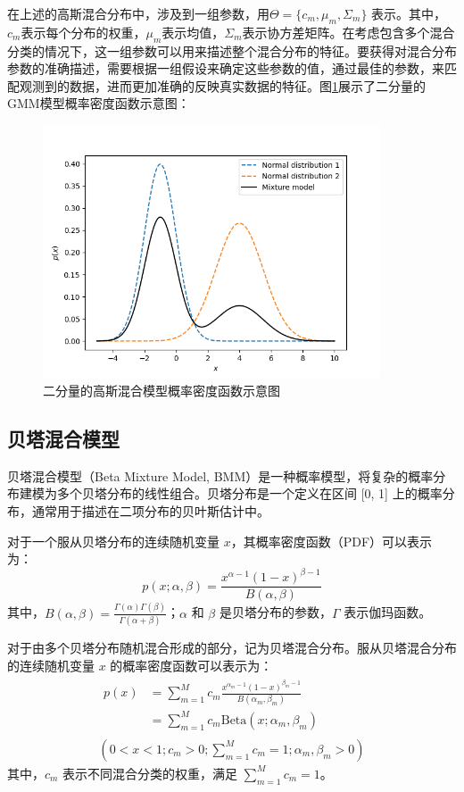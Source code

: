 在上述的高斯混合分布中，涉及到一组参数，用$\Theta = \{c_m, \mu_m, \Sigma_m\}$ 表示。其中，$c_m$表示每个分布的权重，$\mu_m$表示均值，$\Sigma_m$表示协方差矩阵。在考虑包含多个混合分类的情况下，这一组参数可以用来描述整个混合分布的特征。要获得对混合分布参数的准确描述，需要根据一组假设来确定这些参数的值，通过最佳的参数，来匹配观测到的数据，进而更加准确的反映真实数据的特征。图\ref{GMM}展示了二分量的GMM模型概率密度函数示意图：

\begin{figure}[ht!]
    \centering
    \includegraphics[width=10cm]{pic/chapter4/GMM.png}
    \caption{二分量的高斯混合模型概率密度函数示意图}
    \label{GMM}
\end{figure}

\subsection{贝塔混合模型}
贝塔混合模型（Beta Mixture Model, BMM）是一种概率模型，将复杂的概率分布建模为多个贝塔分布的线性组合。贝塔分布是一个定义在区间 [0, 1] 上的概率分布，通常用于描述在二项分布的贝叶斯估计中。

对于一个服从贝塔分布的连续随机变量 $x$，其概率密度函数（PDF）可以表示为：
\begin{equation}
    \label{eq:beta1}
    p(x; \alpha, \beta) = \frac{x^{\alpha - 1} (1 - x)^{\beta - 1}}{B(\alpha, \beta)}
\end{equation}
其中，$B(\alpha, \beta) = \frac{\Gamma(\alpha) \Gamma(\beta)}{\Gamma(\alpha + \beta)}$；$\alpha$ 和 $\beta$ 是贝塔分布的参数，$\Gamma$ 表示伽玛函数。

对于由多个贝塔分布随机混合形成的部分，记为贝塔混合分布。服从贝塔混合分布的连续随机变量 $x$ 的概率密度函数可以表示为：
\begin{equation}
    \label{eq:beta}
    \begin{gathered}
        \begin{aligned}
            p(x) & = \sum_{m=1}^M c_m \frac{x^{\alpha_m - 1} (1 - x)^{\beta_m - 1}}{B(\alpha_m, \beta_m)} \\
                 & = \sum_{m=1}^M c_m \text{Beta}(x; \alpha_m, \beta_m)
        \end{aligned}
        \\
        (0 < x < 1; c_m > 0; \sum_{m=1}^M c_m = 1; \alpha_m, \beta_m > 0)
    \end{gathered}
\end{equation}
其中，$c_m$ 表示不同混合分类的权重，满足 $\sum_{m=1}^M c_m=1$。

